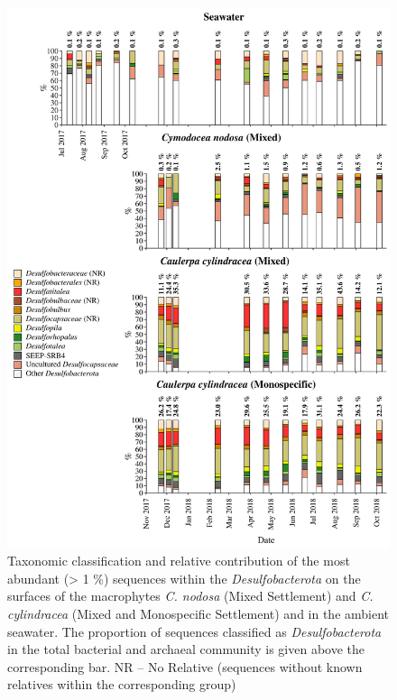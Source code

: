 \documentclass[12pt,]{article}
\begin{document}
\begin{figure}[H]

{\centering \includegraphics[width=0.85\linewidth]{../results/figures/desulfobacterota_bar_plot} 

}

\caption{Taxonomic classification and relative contribution of the most abundant (> 1 \si{\percent}) sequences within the \textit{Desulfobacterota} on the surfaces of the macrophytes \textit{C. nodosa} (Mixed Settlement) and \textit{C. cylindracea} (Mixed and Monospecific Settlement) and in the ambient seawater. The proportion of sequences classified as \textit{Desulfobacterota} in the total bacterial and archaeal community is given above the corresponding bar. NR -- No Relative (sequences without known relatives within the corresponding group)\label{desulfo}}\label{fig:unnamed-chunk-9}
\end{figure}
\end{document}
